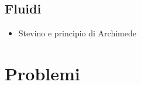 \documentclass[letterpaper,10pt,italian]{jupyterBook}
\begin{document}
\subsection{Fluidi}
\label{\detokenize{ch/mechanics/statics-fluid:fluidi}}\begin{itemize}
\item {} 
\sphinxAtStartPar
Stevino e principio di Archimede

\end{itemize}

\sphinxstepscope


\section{Problemi}
\label{\detokenize{ch/mechanics/statics-problems:problemi}}\label{\detokenize{ch/mechanics/statics-problems:physics-hs-mechanics-statics-problems}}\label{\detokenize{ch/mechanics/statics-problems::doc}}
\end{document}
